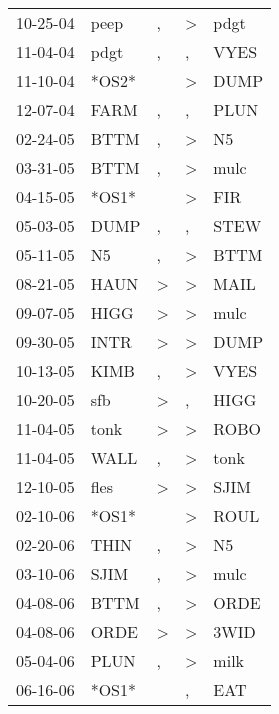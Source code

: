 \begin{supertabular}{lllll}
 10-25-04 &   peep &                , &     \textgreater &   pdgt \\
 11-04-04 &   pdgt &                , &                , &   VYES \\
 11-10-04 &  *OS2* &                  &     \textgreater &   DUMP \\
 12-07-04 &   FARM &                , &                , &   PLUN \\
 02-24-05 &   BTTM &                , &     \textgreater &     N5 \\
 03-31-05 &   BTTM &                , &     \textgreater &   mulc \\
 04-15-05 &  *OS1* &                  &     \textgreater &    FIR \\
 05-03-05 &   DUMP &                , &                , &   STEW \\
 05-11-05 &     N5 &                , &     \textgreater &   BTTM \\
 08-21-05 &   HAUN &     \textgreater &     \textgreater &   MAIL \\
 09-07-05 &   HIGG &     \textgreater &     \textgreater &   mulc \\
 09-30-05 &   INTR &     \textgreater &     \textgreater &   DUMP \\
 10-13-05 &   KIMB &                , &     \textgreater &   VYES \\
 10-20-05 &    sfb &     \textgreater &                , &   HIGG \\
 11-04-05 &   tonk &     \textgreater &     \textgreater &   ROBO \\
 11-04-05 &   WALL &                , &     \textgreater &   tonk \\
 12-10-05 &   fles &     \textgreater &     \textgreater &   SJIM \\
 02-10-06 &  *OS1* &                  &     \textgreater &   ROUL \\
 02-20-06 &   THIN &                , &     \textgreater &     N5 \\
 03-10-06 &   SJIM &                , &     \textgreater &   mulc \\
 04-08-06 &   BTTM &                , &     \textgreater &   ORDE \\
 04-08-06 &   ORDE &     \textgreater &     \textgreater &   3WID \\
 05-04-06 &   PLUN &                , &     \textgreater &   milk \\
 06-16-06 &  *OS1* &                  &                , &    EAT \\

\end{supertabular}
